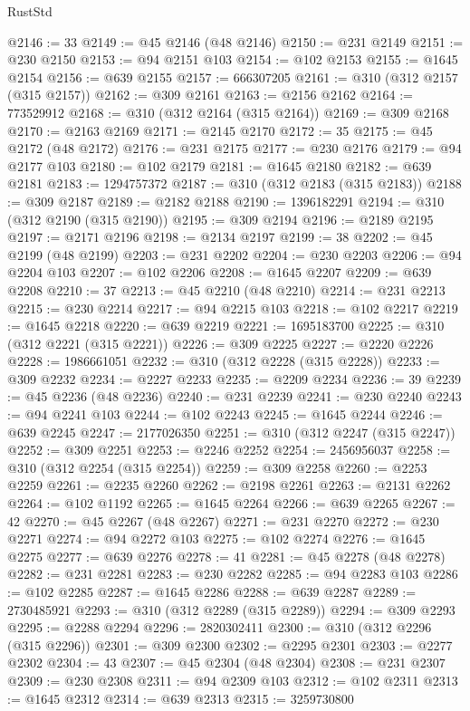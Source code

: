 \begin{lexlean}{RustStd}
\begin{coremodule}
@2146 := 33
@2149 := @45 @2146 (@48 @2146)
@2150 := @231 @2149
@2151 := @230 @2150
@2153 := @94 @2151 @103
@2154 := @102 @2153
@2155 := @1645 @2154
@2156 := @639 @2155
@2157 := 666307205
@2161 := @310 (@312 @2157 (@315 @2157))
@2162 := @309 @2161
@2163 := @2156 @2162
@2164 := 773529912
@2168 := @310 (@312 @2164 (@315 @2164))
@2169 := @309 @2168
@2170 := @2163 @2169
@2171 := @2145 @2170
@2172 := 35
@2175 := @45 @2172 (@48 @2172)
@2176 := @231 @2175
@2177 := @230 @2176
@2179 := @94 @2177 @103
@2180 := @102 @2179
@2181 := @1645 @2180
@2182 := @639 @2181
@2183 := 1294757372
@2187 := @310 (@312 @2183 (@315 @2183))
@2188 := @309 @2187
@2189 := @2182 @2188
@2190 := 1396182291
@2194 := @310 (@312 @2190 (@315 @2190))
@2195 := @309 @2194
@2196 := @2189 @2195
@2197 := @2171 @2196
@2198 := @2134 @2197
@2199 := 38
@2202 := @45 @2199 (@48 @2199)
@2203 := @231 @2202
@2204 := @230 @2203
@2206 := @94 @2204 @103
@2207 := @102 @2206
@2208 := @1645 @2207
@2209 := @639 @2208
@2210 := 37
@2213 := @45 @2210 (@48 @2210)
@2214 := @231 @2213
@2215 := @230 @2214
@2217 := @94 @2215 @103
@2218 := @102 @2217
@2219 := @1645 @2218
@2220 := @639 @2219
@2221 := 1695183700
@2225 := @310 (@312 @2221 (@315 @2221))
@2226 := @309 @2225
@2227 := @2220 @2226
@2228 := 1986661051
@2232 := @310 (@312 @2228 (@315 @2228))
@2233 := @309 @2232
@2234 := @2227 @2233
@2235 := @2209 @2234
@2236 := 39
@2239 := @45 @2236 (@48 @2236)
@2240 := @231 @2239
@2241 := @230 @2240
@2243 := @94 @2241 @103
@2244 := @102 @2243
@2245 := @1645 @2244
@2246 := @639 @2245
@2247 := 2177026350
@2251 := @310 (@312 @2247 (@315 @2247))
@2252 := @309 @2251
@2253 := @2246 @2252
@2254 := 2456956037
@2258 := @310 (@312 @2254 (@315 @2254))
@2259 := @309 @2258
@2260 := @2253 @2259
@2261 := @2235 @2260
@2262 := @2198 @2261
@2263 := @2131 @2262
@2264 := @102 @1192
@2265 := @1645 @2264
@2266 := @639 @2265
@2267 := 42
@2270 := @45 @2267 (@48 @2267)
@2271 := @231 @2270
@2272 := @230 @2271
@2274 := @94 @2272 @103
@2275 := @102 @2274
@2276 := @1645 @2275
@2277 := @639 @2276
@2278 := 41
@2281 := @45 @2278 (@48 @2278)
@2282 := @231 @2281
@2283 := @230 @2282
@2285 := @94 @2283 @103
@2286 := @102 @2285
@2287 := @1645 @2286
@2288 := @639 @2287
@2289 := 2730485921
@2293 := @310 (@312 @2289 (@315 @2289))
@2294 := @309 @2293
@2295 := @2288 @2294
@2296 := 2820302411
@2300 := @310 (@312 @2296 (@315 @2296))
@2301 := @309 @2300
@2302 := @2295 @2301
@2303 := @2277 @2302
@2304 := 43
@2307 := @45 @2304 (@48 @2304)
@2308 := @231 @2307
@2309 := @230 @2308
@2311 := @94 @2309 @103
@2312 := @102 @2311
@2313 := @1645 @2312
@2314 := @639 @2313
@2315 := 3259730800

\end{coremodule}
\end{lexlean}
